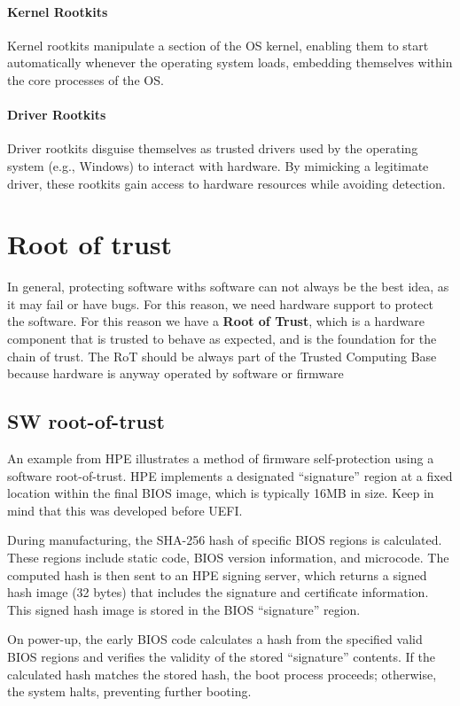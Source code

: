 \paragraph{Kernel Rootkits} Kernel rootkits manipulate a section of
the OS kernel, enabling them to start automatically whenever the
operating system loads, embedding themselves within the core processes
of the OS.

\paragraph{Driver Rootkits} Driver rootkits disguise themselves as
trusted drivers used by the operating system (e.g., Windows) to
interact with hardware. By mimicking a legitimate driver, these
rootkits gain access to hardware resources while avoiding detection.

\section{Root of trust}
In general, protecting software withs software can not always be the
best idea, as it may fail or have bugs. For this reason, we need
hardware support to protect the software.
For this reason we have a \textbf{Root of Trust}, which is a hardware 
component that is trusted to behave as expected, and is the foundation
for the chain of trust. The RoT should be always part of the Trusted
Computing Base because hardware is anyway operated by software or
firmware
\subsection{SW root-of-trust}

An example from HPE illustrates a method of firmware 
self-protection using a software root-of-trust. HPE implements 
a designated “signature” region at a fixed location within the 
final BIOS image, which is typically 16MB in size. Keep in mind that
this was developed before UEFI.

During manufacturing, the SHA-256 hash of specific BIOS 
regions is calculated. These regions include static code, BIOS 
version information, and microcode. The computed hash is then 
sent to an HPE signing server, which returns a signed hash 
image (32 bytes) that includes the signature and certificate 
information. This signed hash image is stored in the BIOS 
“signature” region.

On power-up, the early BIOS code calculates a hash from the 
specified valid BIOS regions and verifies the validity of the 
stored “signature” contents. If the calculated hash matches 
the stored hash, the boot process proceeds; otherwise, the 
system halts, preventing further booting.

